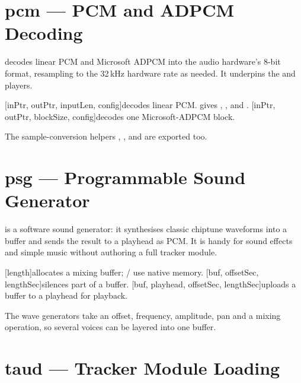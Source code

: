 \section{pcm --- PCM and ADPCM Decoding}

 decodes linear PCM and Microsoft ADPCM into the audio hardware's 8-bit format, resampling to the 32\,kHz hardware rate as needed. It underpins the  and  players.

\begin{outline}
\1[inPtr, outPtr, inputLen, config]{decodes linear PCM.  gives , ,  and .}
\1[inPtr, outPtr, blockSize, config]{decodes one Microsoft-ADPCM block.}
\1
\end{outline}
The sample-conversion helpers , ,  and  are exported too.

\section{psg --- Programmable Sound Generator}

 is a software sound generator: it synthesises classic chiptune waveforms into a buffer and sends the result to a playhead as PCM. It is handy for sound effects and simple music without authoring a full tracker module.

\begin{outline}
\1[length]{allocates a mixing buffer;  /  use native memory.}
\1[buf, offsetSec, lengthSec]{silences part of a buffer.}
\1
\1
\1
\1[buf, playhead, offsetSec, lengthSec]{uploads a buffer to a playhead for playback.}
\end{outline}
The wave generators take an offset, frequency, amplitude, pan and a mixing operation, so several voices can be layered into one buffer.

\section{taud --- Tracker Module Loading}


